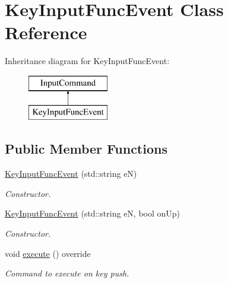 \hypertarget{class_key_input_func_event}{\section{Key\+Input\+Func\+Event Class Reference}
\label{class_key_input_func_event}
}
Inheritance diagram for Key\+Input\+Func\+Event\+:\begin{figure}[H]
\begin{center}
\leavevmode
\includegraphics[height=2.000000cm]{class_key_input_func_event}
\end{center}
\end{figure}
\subsection*{Public Member Functions}
\begin{DoxyCompactItemize}
\item 
\hypertarget{class_key_input_func_event_a91cc8f1399b3ecfbd58e62d82629ab89}{\hyperlink{class_key_input_func_event_a91cc8f1399b3ecfbd58e62d82629ab89}{Key\+Input\+Func\+Event} (std\+::string e\+N)}\label{class_key_input_func_event_a91cc8f1399b3ecfbd58e62d82629ab89}

\begin{DoxyCompactList}\small\item\em Constructor. \end{DoxyCompactList}\item 
\hypertarget{class_key_input_func_event_a7bfef1504d75dae97025d722640a10b1}{\hyperlink{class_key_input_func_event_a7bfef1504d75dae97025d722640a10b1}{Key\+Input\+Func\+Event} (std\+::string e\+N, bool on\+Up)}\label{class_key_input_func_event_a7bfef1504d75dae97025d722640a10b1}

\begin{DoxyCompactList}\small\item\em Constructor. \end{DoxyCompactList}\item 
\hypertarget{class_key_input_func_event_af426cca105b31799f0fb3fd3716c37fb}{void \hyperlink{class_key_input_func_event_af426cca105b31799f0fb3fd3716c37fb}{execute} () override}\label{class_key_input_func_event_af426cca105b31799f0fb3fd3716c37fb}

\begin{DoxyCompactList}\small\item\em Command to execute on key push. \end{DoxyCompactList}\end{DoxyCompactItemize}
